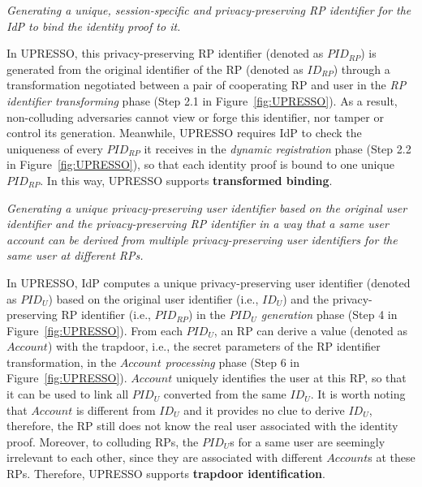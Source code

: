 \vspace{1mm} {\em Generating a unique, session-specific and privacy-preserving RP identifier for the IdP to bind the identity proof to it.}

In UPRESSO, this privacy-preserving RP identifier (denoted as $PID_{RP}$) is generated from the original identifier of the RP (denoted as $ID_{RP}$) through a transformation negotiated between a pair of cooperating RP and user in the \emph{RP identifier transforming} phase (Step 2.1 in Figure~\ref{fig:UPRESSO}). As a result, non-colluding adversaries cannot view or forge this identifier, nor tamper or control its generation. Meanwhile, UPRESSO requires IdP to check the uniqueness of every $PID_{RP}$ it receives in the \emph{dynamic registration} phase (Step 2.2 in Figure~\ref{fig:UPRESSO}), so that each identity proof is bound to one unique $PID_{RP}$. In this way, UPRESSO supports \textbf{transformed binding}.


\vspace{1mm} {\em Generating a unique privacy-preserving user identifier based on the original user identifier and the privacy-preserving RP identifier in a way that a same user account can be derived from multiple privacy-preserving user identifiers for the same user at different RPs.}


In UPRESSO, IdP computes a unique privacy-preserving user identifier (denoted as $PID_U$) based on the original user identifier (i.e., $ID_U$) and the privacy-preserving RP identifier (i.e., $PID_{RP}$) in the \emph{$PID_U$ generation} phase (Step 4 in Figure~\ref{fig:UPRESSO}). From each $PID_U$, an RP can derive a value (denoted as $Account$) with the trapdoor, i.e., the secret parameters of the RP identifier transformation, in the \emph{$Account$ processing} phase (Step 6 in Figure~\ref{fig:UPRESSO}). $Account$ uniquely identifies the user at this RP, so that it can be used to link all $PID_U$ converted from the same $ID_U$. It is worth noting that $Account$ is different from $ID_U$ and it provides no clue to derive $ID_U$, therefore, the RP still does not know the real user associated with the identity proof. Moreover, to colluding RPs, the $PID_U$s for a same user are seemingly irrelevant to each other, since they are associated with different $Account$s at these RPs. Therefore, UPRESSO supports \textbf{trapdoor identification}.

